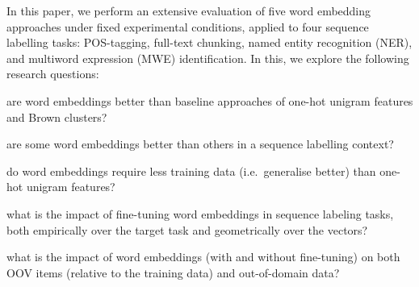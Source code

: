 

In this paper, we perform an extensive evaluation of five word embedding
approaches under fixed experimental conditions, applied to four sequence
labelling tasks: POS-tagging, full-text chunking, named entity
recognition (NER), and multiword expression (MWE) identification. In
this, we explore the following research questions:
\begin{compactenum}[\bf RQ1:]
\item are word embeddings better than baseline approaches of one-hot
  unigram features and Brown clusters?
\item are some word embeddings better than others in a sequence
  labelling context?
\item do word embeddings require less training data (i.e.\ generalise
  better) than one-hot unigram features?
\item what is the impact of fine-tuning word embeddings in sequence
  labeling tasks, both empirically over the target task and
  geometrically over the vectors?
\item what is the impact of word embeddings (with and without
  fine-tuning) on both OOV items (relative to the training data) and
  out-of-domain data?
\end{compactenum}





